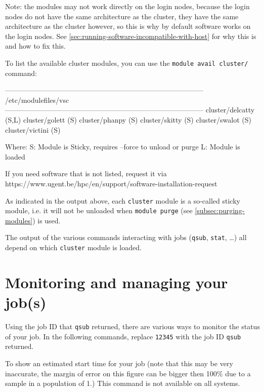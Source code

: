 Note: the \othercluster modules may not work directly on the login nodes, because the
login nodes do not have the same architecture as the \othercluster cluster, they
have the same architecture as the  cluster however, so this is why
by default software works on the login nodes. See \autoref{sec:running-software-incompatible-with-host}
for why this is and how to fix this.

To list the available cluster modules, you can use the \lstinline|module avail cluster/| command:
\begin{prompt}
------------------------------------------------------------------------------------ /etc/modulefiles/vsc ------------------------------------------------------------------------------------
   cluster/delcatty (S,L)    cluster/golett (S)    cluster/phanpy (S)    cluster/skitty (S)    cluster/swalot (S)    cluster/victini (S)

  Where:
   S:  Module is Sticky, requires --force to unload or purge
   L:  Module is loaded

If you need software that is not listed, request it via https://www.ugent.be/hpc/en/support/software-installation-request
\end{prompt}

As indicated in the output above, each \lstinline|cluster| module is a so-called sticky
module, i.e. it will not be unloaded when \lstinline|module purge| (see \autoref{subsec:purging-modules}) is used.

The output of the various commands interacting with jobs (\lstinline|qsub|, \lstinline|stat|, \ldots)
all depend on which \lstinline|cluster| module is loaded.
\fi


\section{Monitoring and managing your job(s)}
\label{sec:monitoring-and-managing-your-jobs}

Using the job ID that \lstinline|qsub| returned, there are various ways to monitor
the status of your job. In the following commands, replace \lstinline|12345|
with the job ID \lstinline|qsub| returned.



\begin{prompt}
\end{prompt}

\ifgent
\else
\ifbrussel
\else
  To show an estimated start time for your job (note that this may be very inaccurate,
  the margin of error on this figure can be bigger then 100\% due to a sample in a
  population of 1.)
  This command is not available on all systems.


